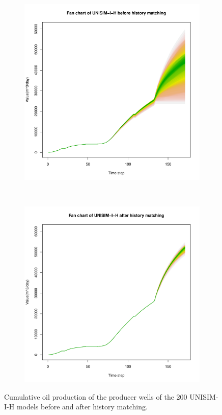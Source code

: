 \documentclass[final,5p,times,twocolumn]{elsarticle}
\begin{document}
\begin{figure}[H]
  \centering
  \begin{subfigure}[b]{0.45\columnwidth}
    \includegraphics[width=\columnwidth]{fan-bef.pdf}
    \caption{}
    \label{fig:fan-bef}
  \end{subfigure}
  ~
  \begin{subfigure}[b]{0.45\columnwidth}
    \includegraphics[width=\columnwidth]{fan-aft.pdf}
    \caption{}
    \label{fig:fan-aft}
  \end{subfigure}

  \caption{Cumulative oil production of the producer wells of the 200 UNISIM-I-H models before and after history matching.}
  \label{fig:fan-bef-aft}
\end{figure}
\end{document}
